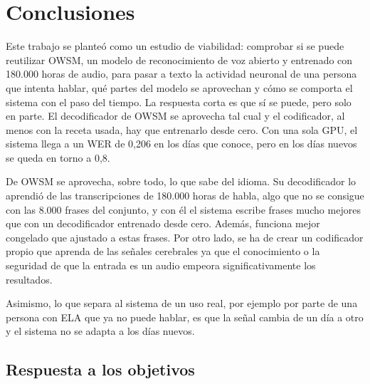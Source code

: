 
\chapter{Conclusiones}
\label{cap:conclusiones}

Este trabajo se planteó como un estudio de viabilidad: comprobar si se puede reutilizar OWSM, un modelo de reconocimiento de voz abierto y entrenado con 180.000 horas de audio, para pasar a texto la actividad neuronal de una persona que intenta hablar, qué partes del modelo se aprovechan y cómo se comporta el sistema con el paso del tiempo. La respuesta corta es que sí se puede, pero solo en parte. El decodificador de OWSM se aprovecha tal cual y el codificador, al menos con la receta usada, hay que entrenarlo desde cero. Con una sola GPU, el sistema llega a un WER de 0,206 en los días que conoce, pero en los días nuevos se queda en torno a 0,8.

De OWSM se aprovecha, sobre todo, lo que sabe del idioma. Su decodificador lo aprendió de las transcripciones de 180.000 horas de habla, algo que no se consigue con las 8.000 frases del conjunto, y con él el sistema escribe frases mucho mejores que con un decodificador entrenado desde cero. Además, funciona mejor congelado que ajustado a estas frases. Por otro lado, se ha de crear un codificador propio que aprenda de las señales cerebrales ya que el conocimiento o la seguridad de que la entrada es un audio empeora significativamente los resultados. 

Asimismo, lo que separa al sistema de un uso real, por ejemplo por parte de una persona con ELA que ya no puede hablar, es que la señal cambia de un día a otro y el sistema no se adapta a los días nuevos.

\section{Respuesta a los objetivos}

